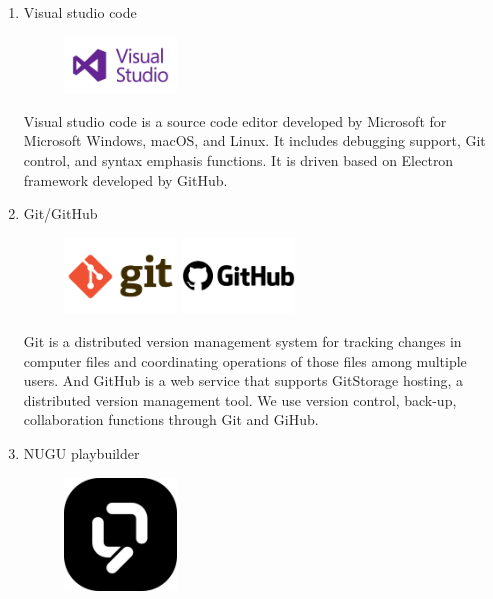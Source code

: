 \documentclass[conference]{IEEEtran}
\begin{document}
\begin{itemize}
\begin{enumerate}
\item Visual studio code
\par \begin{figure}[h!]
\includegraphics[width=3cm]{image/Visual studio code.jpeg}
\centering
\end{figure}

Visual studio code is a source code editor developed by Microsoft for Microsoft Windows, macOS, and Linux. It includes debugging support, Git control, and syntax emphasis functions. It is driven based on Electron framework developed by GitHub.

\item Git/GitHub
\par \begin{figure}[h!]
\includegraphics[width=3cm]{image/Git.jpg}
\includegraphics[width=3cm]{image/GitHub.png}
\centering
\end{figure}

Git is a distributed version management system for tracking changes in computer files and coordinating operations of those files among multiple users. And GitHub is a web service that supports GitStorage hosting, a distributed version management tool. We use version control, back-up, collaboration functions through Git and GiHub.

\item NUGU playbuilder
\par \begin{figure}[h!]
\includegraphics[width=3cm]{image/NUGU playbuilder.png}
\centering
\end{figure}


\end{enumerate}
\end{itemize}
\end{document}
